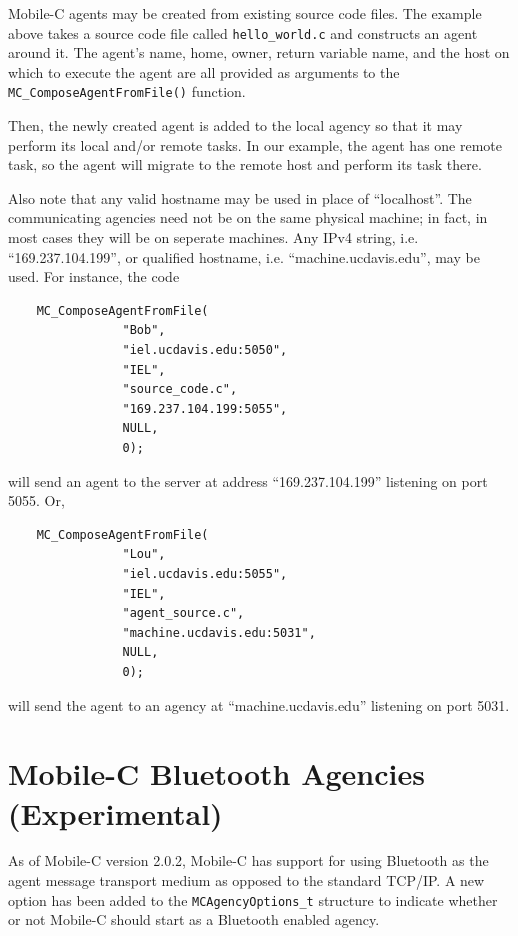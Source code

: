 \documentclass[11pt]{report}
\begin{document}
Mobile-C agents may be created from existing source code files. The example
above takes a source code file called \texttt{hello\_world.c} and constructs
an agent around it. The agent's name, home, owner, return variable name,
and the host on which to execute the agent are all provided as arguments
to the \texttt{MC\_ComposeAgentFromFile()} function. 

Then, the newly created agent is added to the local agency so that it may
perform its local and/or remote tasks. In our example, the agent has
one remote task, so the agent will migrate to the remote host and perform
its task there. 

Also note that any valid hostname may be used in place of ``localhost''. The
communicating agencies need not be on the same physical machine; in fact, in most
cases they will be on seperate machines. Any IPv4 string, i.e. ``169.237.104.199'', or
qualified hostname, i.e. ``machine.ucdavis.edu'', may be used. For instance, the
code
\begin{verbatim}
    MC_ComposeAgentFromFile(
                "Bob",
                "iel.ucdavis.edu:5050",
                "IEL",
                "source_code.c",
                "169.237.104.199:5055",
                NULL,
                0);
\end{verbatim}
will send an agent to the server at address ``169.237.104.199'' listening on
port 5055. Or,
\begin{verbatim}
    MC_ComposeAgentFromFile(
                "Lou",
                "iel.ucdavis.edu:5055",
                "IEL",
                "agent_source.c",
                "machine.ucdavis.edu:5031",
                NULL,
                0);
\end{verbatim}
will send the agent to an agency at ``machine.ucdavis.edu'' listening on 
port 5031.

\section{Mobile-C Bluetooth Agencies (Experimental)}
As of Mobile-C version 2.0.2, Mobile-C has support for using Bluetooth
as the agent message transport medium as opposed to the standard TCP/IP.
A new option has been added to the \texttt{MCAgencyOptions\_t} structure
to indicate whether or not Mobile-C should start as a Bluetooth enabled
agency.
\end{document}
